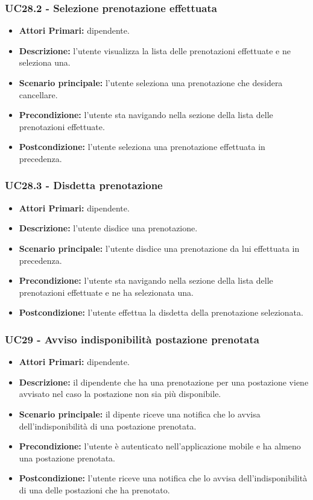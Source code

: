 \subsubsection{ UC28.2 - Selezione prenotazione effettuata}
\begin{itemize}
	\item\textbf{Attori Primari:} dipendente.
	\item\textbf{Descrizione:} l’utente visualizza la lista delle prenotazioni effettuate e ne seleziona una.
	\item\textbf{Scenario principale:} l’utente seleziona una prenotazione che desidera cancellare.
	\item\textbf{Precondizione:} l'utente sta navigando nella sezione della lista delle prenotazioni effettuate.
	\item\textbf{Postcondizione:} l’utente seleziona una prenotazione effettuata in precedenza.
\end{itemize}

\subsubsection{ UC28.3 - Disdetta prenotazione}
\begin{itemize}
	\item\textbf{Attori Primari:} dipendente.
	\item\textbf{Descrizione:} l’utente disdice una prenotazione. 
	\item\textbf{Scenario principale:} l’utente disdice una prenotazione da lui effettuata in precedenza.
	\item\textbf{Precondizione:} l'utente sta navigando nella sezione della lista delle prenotazioni effettuate e ne ha selezionata una.
	\item\textbf{Postcondizione:} l’utente effettua la disdetta della prenotazione selezionata.
\end{itemize}

\subsubsection{ UC29 - Avviso indisponibilità postazione prenotata }
\begin{itemize}
	\item\textbf{Attori Primari:} dipendente.
	\item\textbf{Descrizione:} il dipendente che ha una prenotazione per una postazione viene avvisato nel caso la postazione non sia più disponibile.
	\item\textbf{Scenario principale:} il dipente riceve una notifica che lo avvisa dell'indisponibilità di una postazione prenotata.
	\item\textbf{Precondizione:} l’utente è autenticato nell'applicazione mobile e ha almeno una postazione prenotata.
	\item\textbf{Postcondizione:} l'utente riceve una notifica che lo avvisa dell'indisponibilità di una delle postazioni che ha prenotato.
\end{itemize}

